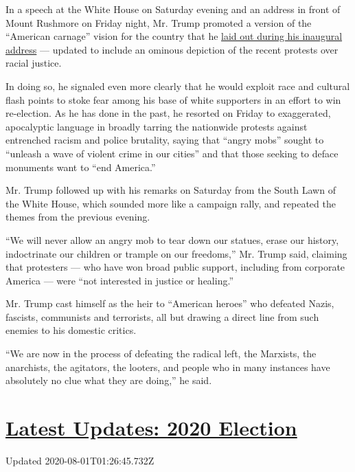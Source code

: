 In a speech at the White House on Saturday evening and an address in
front of Mount Rushmore on Friday night, Mr. Trump promoted a version of
the ``American carnage'' vision for the country that he
\href{https://www.nytimes.com/2017/01/20/us/politics/trump-inauguration-day.html}{laid
out during his inaugural address} --- updated to include an ominous
depiction of the recent protests over racial justice.

In doing so, he signaled even more clearly that he would exploit race
and cultural flash points to stoke fear among his base of white
supporters in an effort to win re-election. As he has done in the past,
he resorted on Friday to exaggerated, apocalyptic language in broadly
tarring the nationwide protests against entrenched racism and police
brutality, saying that ``angry mobs'' sought to ``unleash a wave of
violent crime in our cities'' and that those seeking to deface monuments
want to ``end America.''

Mr. Trump followed up with his remarks on Saturday from the South Lawn
of the White House, which sounded more like a campaign rally, and
repeated the themes from the previous evening.

``We will never allow an angry mob to tear down our statues, erase our
history, indoctrinate our children or trample on our freedoms,'' Mr.
Trump said, claiming that protesters --- who have won broad public
support, including from corporate America --- were ``not interested in
justice or healing.''

Mr. Trump cast himself as the heir to ``American heroes'' who defeated
Nazis, fascists, communists and terrorists, all but drawing a direct
line from such enemies to his domestic critics.

``We are now in the process of defeating the radical left, the Marxists,
the anarchists, the agitators, the looters, and people who in many
instances have absolutely no clue what they are doing,'' he said.

\hypertarget{latest-updates-2020-election}{%
\section{\texorpdfstring{\href{https://www.nytimes.com/2020/07/31/us/elections/biden-vs-trump.html?action=click\&pgtype=Article\&state=default\&region=MAIN_CONTENT_1\&context=storylines_live_updates}{Latest
Updates: 2020
Election}}{Latest Updates: 2020 Election}}\label{latest-updates-2020-election}}

Updated 2020-08-01T01:26:45.732Z

